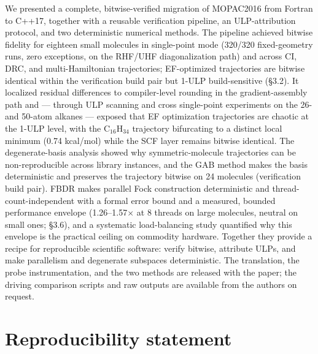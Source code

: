 \documentclass[preprint,12pt]{elsarticle}
\begin{document}
We presented a complete, bitwise-verified migration of MOPAC2016 from Fortran to C++17, together with a reusable verification pipeline, an ULP-attribution protocol, and two deterministic numerical methods. The pipeline achieved bitwise fidelity for eighteen small molecules in single-point mode (320/320 fixed-geometry runs, zero exceptions, on the RHF/UHF diagonalization path) and across CI, DRC, and multi-Hamiltonian trajectories; EF-optimized trajectories are bitwise identical within the verification build pair but 1-ULP build-sensitive (\S{}3.2). It localized residual differences to compiler-level rounding in the gradient-assembly path and --- through ULP scanning and cross single-point experiments on the 26- and 50-atom alkanes --- exposed that EF optimization trajectories are chaotic at the 1-ULP level, with the C$_{16}$H$_{34}$ trajectory bifurcating to a distinct local minimum (0.74 kcal/mol) while the SCF layer remains bitwise identical. The degenerate-basis analysis showed why symmetric-molecule trajectories can be non-reproducible across library instances, and the GAB method makes the basis deterministic and preserves the trajectory bitwise on 24 molecules (verification build pair). FBDR makes parallel Fock construction deterministic and thread-count-independent with a formal error bound and a measured, bounded performance envelope (1.26--1.57$\times$ at 8 threads on large molecules, neutral on small ones; \S{}3.6), and a systematic load-balancing study quantified why this envelope is the practical ceiling on commodity hardware. Together they provide a recipe for reproducible scientific software: verify bitwise, attribute ULPs, and make parallelism and degenerate subspaces deterministic. The translation, the probe instrumentation, and the two methods are released with the paper; the driving comparison scripts and raw outputs are available from the authors on request.



\section{Reproducibility statement}
\end{document}
